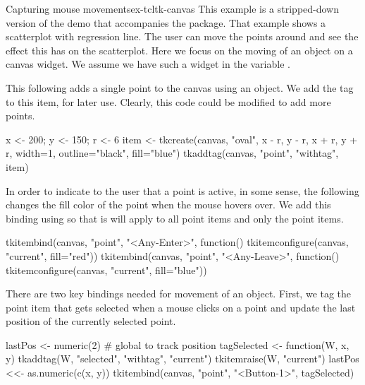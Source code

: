 \begin{example}{Capturing mouse movements}{ex-tcltk-canvas}
This example is a stripped-down version of the  demo
that accompanies the  package. That example shows a
scatterplot with regression line. The user can move the points around
and see the effect this has on the scatterplot. Here we focus on the
moving of an object on a canvas widget. We assume we have such a
widget in the variable .


This following adds a single point to the canvas using an
 object. We add the  tag to this item, for
later use. Clearly, this code could be modified to add more points.
\begin{Schunk}
\begin{Sinput}
 x <- 200; y <- 150; r <- 6
 item <- tkcreate(canvas, "oval", x - r, y - r, x + r, y + r,
                  width=1, outline="black",
                  fill="blue")
 tkaddtag(canvas, "point", "withtag", item)
\end{Sinput}
\end{Schunk}

In order to indicate to the user that a point is active, in some
sense, the following changes the fill color of the point when the
mouse hovers over. We add this binding using 
so that is will apply to all point items and only the point items.
\begin{Schunk}
\begin{Sinput}
 tkitembind(canvas, "point", "<Any-Enter>", function()
            tkitemconfigure(canvas, "current", fill="red"))
 tkitembind(canvas, "point", "<Any-Leave>", function()
            tkitemconfigure(canvas, "current", fill="blue"))
\end{Sinput}
\end{Schunk}

There are two key bindings needed for movement of an object. First, we
tag the point item that gets selected when a mouse clicks on a point
and update the last position of the currently selected point.
\begin{Schunk}
\begin{Sinput}
 lastPos <- numeric(2)            # global to track position
 tagSelected <- function(W, x, y) {
   tkaddtag(W,  "selected",  "withtag",  "current")
   tkitemraise(W, "current")
   lastPos <<- as.numeric(c(x, y))
 }
 tkitembind(canvas, "point", "<Button-1>",  tagSelected)
\end{Sinput}
\end{Schunk}


\end{example}

